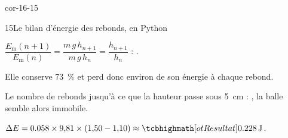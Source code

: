 \begin{blocLivre}{cor-16-15}
\begin{corrige}{15}{Le bilan d'énergie des rebonds, en Python}
\begin{questions}
\item $\dfrac{E_\mathrm{m}(n+1)}{E_\mathrm{m}(n)}=\dfrac{m\,g\,h_{n+1}}{m\,g\,h_n}=\dfrac{h_{n+1}}{h_n}$ : .
\item Elle conserve \qty{73}{\percent} et perd donc environ  de son énergie à chaque rebond.
\item Le nombre de rebonds jusqu'à ce que la hauteur passe sous \qty{5}{cm} : , la balle semble alors immobile.
\item $\Delta E=\num{0,058}\times9{,}81\times(1{,}50-1{,}10)\approx\res{\qty{0,228}{J}}$.
\end{questions}
\end{corrige}
\end{blocLivre}
